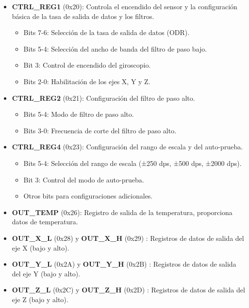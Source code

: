 \begin{itemize}
    \item \textbf{CTRL\_REG1} (0x20): Controla el encendido del sensor y la configuración básica de la tasa de salida de datos y los filtros.
    \begin{itemize}
        \item Bits 7-6: Selección de la tasa de salida de datos (ODR).
        \item Bits 5-4: Selección del ancho de banda del filtro de paso bajo.
        \item Bit 3: Control de encendido del giroscopio.
        \item Bits 2-0: Habilitación de los ejes X, Y y Z.
    \end{itemize}

    \item \textbf{CTRL\_REG2} (0x21): Configuración del filtro de paso alto.
    \begin{itemize}
        \item Bits 5-4: Modo de filtro de paso alto.
        \item Bits 3-0: Frecuencia de corte del filtro de paso alto.
    \end{itemize}

    \item \textbf{CTRL\_REG4} (0x23): Configuración del rango de escala y del auto-prueba.
    \begin{itemize}
        \item Bits 5-4: Selección del rango de escala (±250 dps, ±500 dps, ±2000 dps).
        \item Bit 3: Control del modo de auto-prueba.
        \item Otros bits para configuraciones adicionales.
    \end{itemize}

    \item \textbf{OUT\_TEMP} (0x26): Registro de salida de la temperatura, proporciona datos de temperatura.

    \item \textbf{OUT\_X\_L} (0x28) y \textbf{OUT\_X\_H} (0x29) : Registros de datos de salida del eje X (bajo y alto).

    \item \textbf{OUT\_Y\_L} (0x2A) y \textbf{OUT\_Y\_H} (0x2B) : Registros de datos de salida del eje Y (bajo y alto).

    \item \textbf{OUT\_Z\_L} (0x2C) y \textbf{OUT\_Z\_H} (0x2D) : Registros de datos de salida del eje Z (bajo y alto).
\end{itemize}


